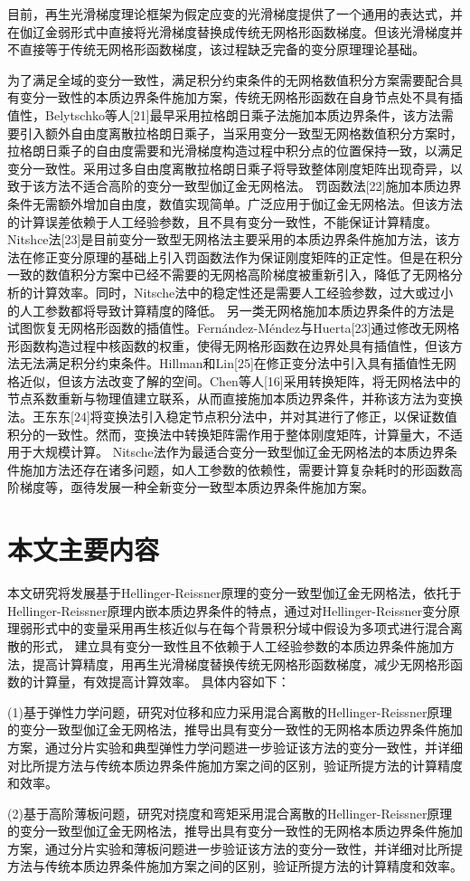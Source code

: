目前，再生光滑梯度理论框架为假定应变的光滑梯度提供了一个通用的表达式，并在伽辽金弱形式中直接将光滑梯度替换成传统无网格形函数梯度。但该光滑梯度并不直接等于传统无网格形函数梯度，该过程缺乏完备的变分原理理论基础。\par
为了满足全域的变分一致性，满足积分约束条件的无网格数值积分方案需要配合具有变分一致性的本质边界条件施加方案，传统无网格形函数在自身节点处不具有插值性，Belytschko等人[21]最早采用拉格朗日乘子法施加本质边界条件，该方法需要引入额外自由度离散拉格朗日乘子，当采用变分一致型无网格数值积分方案时，拉格朗日乘子的自由度需要和光滑梯度构造过程中积分点的位置保持一致，以满足变分一致性。采用过多自由度离散拉格朗日乘子将导致整体刚度矩阵出现奇异，以致于该方法不适合高阶的变分一致型伽辽金无网格法。
罚函数法[22]施加本质边界条件无需额外增加自由度，数值实现简单。广泛应用于伽辽金无网格法。但该方法的计算误差依赖于人工经验参数，且不具有变分一致性，不能保证计算精度。
Nitshce法[23]是目前变分一致型无网格法主要采用的本质边界条件施加方法，该方法在修正变分原理的基础上引入罚函数法作为保证刚度矩阵的正定性。但是在积分一致的数值积分方案中已经不需要的无网格高阶梯度被重新引入，降低了无网格分析的计算效率。同时，Nitsche法中的稳定性还是需要人工经验参数，过大或过小的人工参数都将导致计算精度的降低。
另一类无网格施加本质边界条件的方法是试图恢复无网格形函数的插值性。Fernández-Méndez与Huerta[23]通过修改无网格形函数构造过程中核函数的权重，使得无网格形函数在边界处具有插值性，但该方法无法满足积分约束条件。Hillman和Lin[25]在修正变分法中引入具有插值性无网格近似，但该方法改变了解的空间。Chen等人[16]采用转换矩阵，将无网格法中的节点系数重新与物理值建立联系，从而直接施加本质边界条件，并称该方法为变换法。王东东[24]将变换法引入稳定节点积分法中，并对其进行了修正，以保证数值积分的一致性。然而，变换法中转换矩阵需作用于整体刚度矩阵，计算量大，不适用于大规模计算。
Nitsche法作为最适合变分一致型伽辽金无网格法的本质边界条件施加方法还存在诸多问题，如人工参数的依赖性，需要计算复杂耗时的形函数高阶梯度等，亟待发展一种全新变分一致型本质边界条件施加方案。
\section{本文主要内容}
本文研究将发展基于Hellinger-Reissner原理的变分一致型伽辽金无网格法，依托于Hellinger-Reissner原理内嵌本质边界条件的特点，通过对Hellinger-Reissner变分原理弱形式中的变量采用再生核近似与在每个背景积分域中假设为多项式进行混合离散的形式，
建立具有变分一致性且不依赖于人工经验参数的本质边界条件施加方法，提高计算精度，用再生光滑梯度替换传统无网格形函数梯度，减少无网格形函数的计算量，有效提高计算效率。
具体内容如下：\par
(1)基于弹性力学问题，研究对位移和应力采用混合离散的Hellinger-Reissner原理的变分一致型伽辽金无网格法，推导出具有变分一致性的无网格本质边界条件施加方案，通过分片实验和典型弹性力学问题进一步验证该方法的变分一致性，并详细对比所提方法与传统本质边界条件施加方案之间的区别，验证所提方法的计算精度和效率。\par
(2)基于高阶薄板问题，研究对挠度和弯矩采用混合离散的Hellinger-Reissner原理的变分一致型伽辽金无网格法，推导出具有变分一致性的无网格本质边界条件施加方案，通过分片实验和薄板问题进一步验证该方法的变分一致性，并详细对比所提方法与传统本质边界条件施加方案之间的区别，验证所提方法的计算精度和效率。\par




